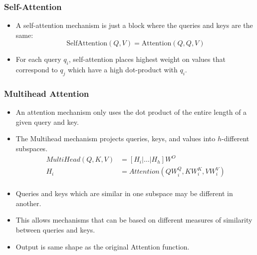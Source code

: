 \documentclass[t]{beamer}
\begin{document}
  \begin{frame}
  \frametitle{Self-Attention}
  \begin{itemize}
  \item A self-attention mechanism is just a block where the queries and keys are the same:
    \[
      \mathrm{SelfAttention}(Q, V) = \mathrm{Attention}(Q, Q, V)
    \]

   \item For each query $q_i$, self-attention places highest weight on values that correspond to $q_j$ which have a high dot-product with $q_i$.  
    \end{itemize}
    \end{frame}

    \begin{frame}
      \frametitle{Multihead Attention}
      \begin{itemize}
      \item An attention mechanism only uses the dot product of the entire length of a given query and key.
      \item The Multihead mechanism projects queries, keys, and values into $h$-different subspaces.
        \[
          \begin{split}
            MultiHead(Q, K, V) &= [H_i | \dots | H_h] W^O \\
            H_i &= Attention(QW_i^Q, KW_i^K, VW_i^V) \\
        \end{split}
        \]
      \item Queries and keys which are similar in one subspace may be different in another.
      \item This allows mechanisms that can be based on different measures of similarity between queries and keys.
       \item Output is same shape as the original Attention function.
      \end{itemize}
    \end{frame}
\end{document}
